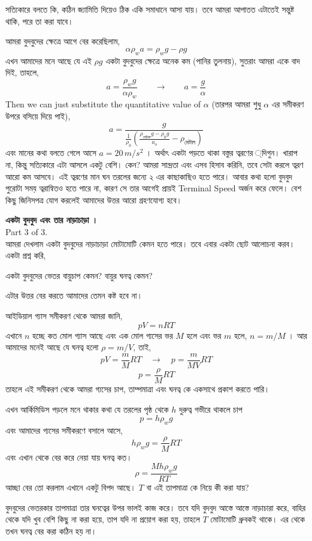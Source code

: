 \documentclass[11pt,a4paper]{article}
\begin{document}
সত্যিকারে বলতে কি, কঠিন জ্যামিতি দিয়েও ঠিক একি সমাধানে আসা যায়। তবে আমরা আপাতত এটাতেই সন্তুষ্ট থাকি, পরে তা করা যাবে। 

আমরা বুদবুদের ক্ষেত্রে আগে বের করেছিলাম, 
\[ \alpha \rho_w a =  \rho_w g -  \rho g \] 
এখন আমাদের মনে আছে যে এই $\rho g$ একটা বুদবুদের ক্ষেত্রে অনেক কম (পানির তুলনায়), সুতরাং আমরা একে বাদ দিই, তাহলে, 
\[a  = \frac{ \rho_w g } {\alpha \rho_w } \qquad \rightarrow \qquad a = \frac{g}{\alpha} \]
Then we can just substitute the quantitative value of $\alpha$ (তারপর আমরা শুধু $\alpha$ এর সমীকরণ উপরে বসিয়ে দিয়ে পাই), 
\[a =  \frac{g}
{\frac{1}{\rho_0} \left( \frac{\rho_{\text{মেটাল}} g - \rho _0 g}{a_o} - \rho_{\text{মেটাল}} \right) 
}
\]
এবং মানের কথা বলতে গেলে আসে $a = 20 \, m/s^2$ । অর্থাৎ একটা পড়তে থাকা বস্তুর ত্বরণের ্দিগুন। খারাপ না, কিন্তু সত্যিকারে এটা আসলে একটু বেশি। কেন? আমরা সান্দ্রতা এবং এসব হিসাব করিনি, তবে সেটা করলে ত্বরণ আরো কম আসবে। এই ত্বরণের মান ঘন তরলের জন্যে ২ এর কাছাকাছিও হতে পারে। আবার কথা হলো বুদবুদ পুরোটা সময় ত্বরান্বিতও হতে পারে না, কারণ সে তার আগেই প্রায়ই Terminal Speed অর্জন করে ফেলে। বেশ কিছু জিনিসপত্র যোগ করলেই আমাদের উত্তর আরো গ্রহণযোগ্য হবে। 

\newpage
\textbf{একটা বুদবুদ এবং তার নাড়াচাড়া । } \\ 
{\tiny Part 3 of 3.} \\
আমরা দেখলাম একটা বুদবুদের নাড়াচাড়া মোটামোটি কেমন হতে পারে। তবে এবার একটা ছোট আলোচনা করব। 
একটা প্রশ্ন করি, 
\begin{center}
একটা বুদবুদের ভেতর বায়ুচাপ কেমন? বায়ুর ঘনত্ব কেমন?   
\end{center}
এটার উত্তর বের করতে আমাদের তেমন কষ্ট হবে না। 

আইডিয়াল গ্যাস সমীকরণ থেকে আমরা জানি, 
\[ pV = nRT \]
এখানে $n$ হচ্ছে কত মোল গ্যাস আছে এবং এক মোল গ্যসের ভর $M$ হলে এবং ভর $m$ হলে, $n = m/M$ । 
আর আমাদের মনেই আছে যে ঘনত্ব হলো $\rho = m/V$, তাই, 
\[ pV = \frac{m}{M} RT \quad \rightarrow \quad p = \frac  {m} {MV } RT \]
\[ p = \frac{\rho}{M} RT \] 
তাহলে এই সমীকরণ থেকে আমরা গ্যসের চাপ, তাম্পমাত্রা এবং ঘনত্ব কে একসাথে প্রকাশ করতে পারি। 

এখন আর্কিমিডিস পড়লে মনে থাকার কথা যে তরলের পৃষ্ঠ থেকে $h$ দুরুত্ব গভীরে থাকলে চাপ 
\[ p = h \rho_w g \]
এবং আমাদের গ্যসের সমীকরণে বসালে আসে, 
\[ h \rho_w g = \frac{ \rho}{M} RT \] 
এবং এখান থেকে বের করে নেয়া যায় ঘনত্ব কত। 
\[ \rho =  \frac{M h \rho_w g }{ RT }  \]
আচ্ছা বের তো করলাম এখানে একটু বিপদ আছে। $T$ বা এই তাপমাত্রা কে নিয়ে কী করা যায়? 

বুদবুদের ভেতরকার তাপমাত্রা তার ঘনত্বের উপর ভালই কাজ করে। তবে যদি বুদবুদ আস্তে আস্তে নাড়াচারা করে, বাহির থেকে যদি খুব বেশি কিছু না করা হয়ে, তাপ যদি না প্রয়োগ করা হয়, তাহলে $T$ মোটামোটি ধ্রুবকই থাকে। এর থেকে তখন ঘনত্ব বের করা কঠিন হয় না। 
\end{document}
